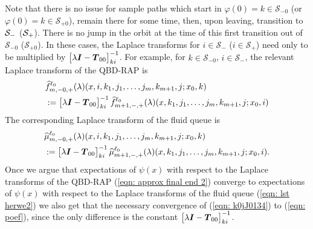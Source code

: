 Note that there is no issue for sample paths which start in \(\varphi(0)=k\in\mathcal S_{-0}\) (or \(\varphi(0)=k\in\mathcal S_{+0}\)), remain there for some time, then, upon leaving, transition to \(\mathcal{S}_-\) (\(\mathcal{S}_+\)). There is no jump in the orbit at the time of this first transition out of \(\mathcal S_{-0}\) (\(\mathcal S_{+0}\)). In these cases, the Laplace transforms for \(i\in\mathcal S_-\) (\(i\in\mathcal S_+\)) need only to be multiplied by \(\begin{bmatrix} \lambda \boldsymbol I - \boldsymbol T_{00} \end{bmatrix}^{-1}_{ki}\). For example, for \(k\in\mathcal S_{-0}\), \(i\in\mathcal S_{-}\), the relevant Laplace transform of the QBD-RAP is 
\begin{align}
		\nonumber &\widehat{f}_{m,-0,+}^{\ell_0}(\lambda)(x,i,k_1,j_1,\dots,j_m,k_{m+1},j;x_0,k) 
		\\&:=\vligne{\lambda \bs I - \bs T_{00}}^{-1}_{ki}\widehat{f}_{m+1,-,+}^{\ell_0}(\lambda)(x,k_1,j_1,\dots,j_m,k_{m+1},j;x_0,i)
		\label{eqn: k0jJ0134}%
\end{align} 
The corresponding Laplace transform of the fluid queue is 
\begin{align}
	&\widehat \mu_{m,-0,+}^{\ell_0}(\lambda)(x,i,k_1,j_1,\dots,j_m,k_{m+1},j;x_0,k) \nonumber 
	\\&:= \begin{bmatrix} \lambda \boldsymbol I - \boldsymbol T_{00} \end{bmatrix}^{-1}_{ki}\widehat \mu_{m+1,-,+}^{\ell_0}(\lambda)(x,k_1,j_1,\dots,j_m,k_{m+1},j;x_0,i). \label{eqn:  poef}
\end{align}
Once we argue that expectations of \(\psi(x)\) with respect to the Laplace transforms of the QBD-RAP (\ref{eqn: approx final end 2}) converge to expectations of \(\psi(x)\) with respect to the Laplace transforms of the fluid queue (\ref{eqn: lst herwe2}) we also get that the necessary convergence of (\ref{eqn: k0jJ0134}) to (\ref{eqn:  poef}), since the only difference is the constant \(\begin{bmatrix} \lambda \boldsymbol I - \boldsymbol T_{00} \end{bmatrix}^{-1}_{ki}\). 

